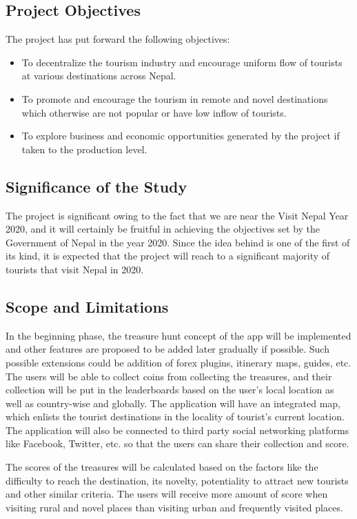 \documentclass[12pt, a4paper, oneside]{article}
\begin{document}
\subsection{Project Objectives}
The project has put forward the following objectives:

\begin{itemize}
	\item To decentralize the tourism industry and encourage uniform flow of tourists at various destinations across Nepal.
	\item To promote and encourage the tourism in remote and novel destinations which otherwise are not popular or have low inflow of tourists.
	\item To explore business and economic opportunities generated by the project if taken to the production level.
\end{itemize}

\subsection{Significance of the Study}
The project is significant owing to the fact that we are near the Visit Nepal Year 2020, and it will certainly be fruitful in achieving the objectives set by the Government of Nepal in the year 2020. Since the idea behind is one of the first of its kind, it is expected that the project will reach to a significant majority of tourists that visit Nepal in 2020.

\subsection{Scope and Limitations}
In the beginning phase, the treasure hunt concept of the app will be implemented and other features are proposed to be added later gradually if possible. Such possible extensions could be addition of forex plugins, itinerary maps, guides, etc. The users will be able to collect coins from collecting the treasures, and their collection will be put in the leaderboards based on the user's local location as well as country-wise and globally. The application will have an integrated map, which enlists the tourist destinations in the locality of tourist's current location. The application will also be connected to third party social networking platforms like Facebook, Twitter, etc. so that the users can share their collection and score. 

The scores of the treasures will be calculated based on the factors like the difficulty to reach the destination, its novelty, potentiality to attract new tourists and other similar criteria. The users will receive more amount of score when visiting rural and novel places than visiting urban and frequently visited places.
\end{document}

